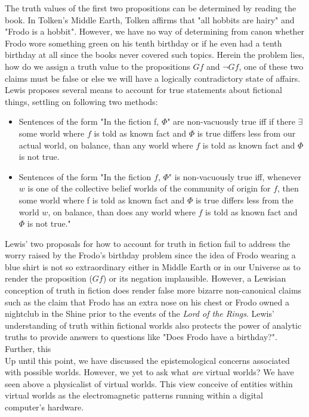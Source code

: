 The truth values of the first two propositions can be determined by reading the book. In Tolken's Middle Earth, Tolken affirms that "all hobbits are hairy" and "Frodo is a hobbit". However, we have no way of determining from canon whether Frodo wore something green on his tenth birthday or if he even had a tenth birthday at all since the books never covered such topics. Herein the problem lies, how do we assign a truth value to the propositions $Gf$ and $\neg Gf$, one of these two claims must be false or else we will have a logically contradictory state of affairs. 
	 Lewis proposes several means to account for true statements about fictional things, settling on following two methods: 
 \begin{itemize}
	\item Sentences of the form "In the fiction f, $\Phi$" are non-vacuously true iff if there $\exists$ some
world where $f$ is told as known fact and $\Phi$ is true differs less from our actual world, on
balance, than any world where $f$ is told as known fact and $\Phi$ is not true. \cite{Lewis1978-LEWTIF}
\item Sentences of the form "In the fiction $f$, $\Phi$" is non-vacuously true iff,
whenever $w$ is one of the collective belief worlds of the community of origin for $f$, then
some world where f is told as known fact and $\Phi$ is true differs less from the world $w$, on
balance, than does any world where $f$ is told as known fact and $\Phi$ is not true." \cite{Lewis1978-LEWTIF}
\end{itemize}
Lewis' two proposals for how to account for truth in fiction fail to address the worry raised by the Frodo's birthday problem since the idea of Frodo wearing a blue shirt is not so extraordinary either in Middle Earth or in our Universe as to render the proposition ($Gf$) or its negation implausible. However, a Lewisian conception of truth in fiction does render false more bizarre non-canonical claims such as the claim that Frodo has an extra nose on his chest or Frodo owned a nightclub in the Shine prior to the events of the \textit{Lord of the Rings}. Lewis' understanding of truth within fictional worlds also protects the power of analytic truths to provide answers to questions like "Does Frodo have a birthday?". Further, this 
\\
Up until this point, we have discussed the epistemological concerns associated with possible worlds. However, we yet to ask what \textit{are} virtual worlds? We have seen above a physicalist of virtual worlds. This view conceive of entities within virtual worlds as the electromagnetic patterns running within a digital computer's hardware. 

